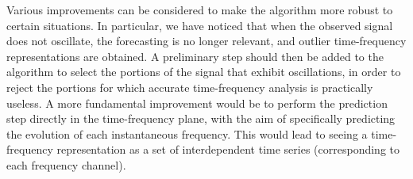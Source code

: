 \documentclass[journal]{IEEEtran}
\begin{document}
Various improvements can be considered to make the algorithm more robust to certain situations. In particular, we have noticed that when the observed signal does not oscillate, the forecasting is no longer relevant, and outlier time-frequency representations are obtained. A preliminary step should then be added to the algorithm to select the portions of the signal that exhibit oscillations, in order to reject the portions for which accurate time-frequency analysis is practically useless. A more fundamental improvement would be to perform the prediction step directly in the time-frequency plane, with the aim of specifically predicting the evolution of each instantaneous frequency. This would lead to seeing a time-frequency representation as a set of interdependent time series (corresponding to each frequency channel).

%





%
\end{document}

